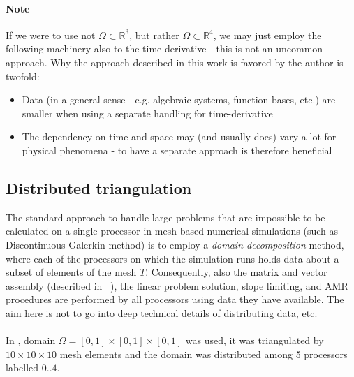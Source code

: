 \paragraph{Note}
If we were to use not $\Omega\subset\mathbb{R}^3$, but rather $\Omega\subset\mathbb{R}^4$, we may just employ the following machinery also to the time-derivative - this is not an uncommon approach. Why the approach described in this work is favored by the author is twofold:
\begin{itemize}
    \item Data (in a general sense - e.g. algebraic systems, function bases, etc.) are smaller when using a separate handling for time-derivative
    \item The dependency on time and space may (and usually does) vary a lot for physical phenomena - to have a separate approach is therefore beneficial
\end{itemize}
\subsection{Distributed triangulation}
\label{section:ditributedTria}
The standard approach to handle large problems that are impossible to be calculated on a single processor in mesh-based numerical simulations (such as Discontinuous Galerkin method) is to employ a \textit{domain decomposition} method, where each of the processors on which the simulation runs holds data about a subset of elements of the mesh $T$.
Consequently, also the matrix and vector assembly (described in ~), the linear problem solution, slope limiting, and AMR procedures are performed by all processors using data they have available. The aim here is not to go into deep technical details of distributing data, etc.
\paragraph{}
In , domain $\Omega = \left[0, 1\right] \times \left[0, 1\right] \times \left[0, 1\right]$ was used, it was triangulated by $10 \times 10 \times 10$ mesh elements and the domain was distributed among 5 processors labelled $0..4$.

